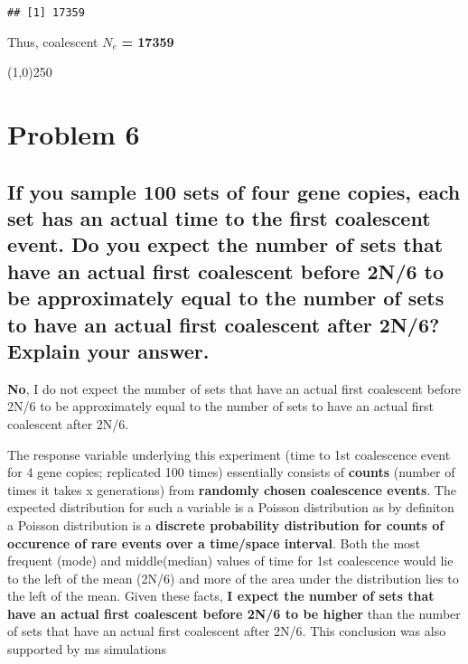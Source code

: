 \documentclass[]{article}
\begin{document}
\begin{verbatim}
## [1] 17359
\end{verbatim}

Thus, coalescent $N_e$ \textbf{= 17359}

\begin{center}
\line(1,0){250}
\end{center}

\pagebreak

\section{Problem 6}\label{problem-6}

\subsection{If you sample 100 sets of four gene copies, each set has an
actual time to the first coalescent event. Do you expect the number of
sets that have an actual first coalescent before 2N/6 to be
approximately equal to the number of sets to have an actual first
coalescent after 2N/6? Explain your
answer.}\label{if-you-sample-100-sets-of-four-gene-copies-each-set-has-an-actual-time-to-the-first-coalescent-event.-do-you-expect-the-number-of-sets-that-have-an-actual-first-coalescent-before-2n6-to-be-approximately-equal-to-the-number-of-sets-to-have-an-actual-first-coalescent-after-2n6-explain-your-answer.}

\textbf{No}, I do not expect the number of sets that have an actual
first coalescent before 2N/6 to be approximately equal to the number of
sets to have an actual first coalescent after 2N/6.

The response variable underlying this experiment (time to 1st
coalescence event for 4 gene copies; replicated 100 times) essentially
consists of \textbf{counts} (number of times it takes x generations)
from \textbf{randomly chosen coalescence events}. The expected
distribution for such a variable is a Poisson distribution as by
definiton a Poisson distribution is a
\textbf{discrete probability distribution for counts of occurence of rare events over a time/space interval}.
Both the most frequent (mode) and middle(median) values of time for 1st
coalescence would lie to the left of the mean (2N/6) and more of the
area under the distribution lies to the left of the mean. Given these
facts,
\textbf{I expect the number of sets that have an actual first coalescent before 2N/6 to be higher}
than the number of sets that have an actual first coalescent after 2N/6.
This conclusion was also supported by ms simulations \cite{ms}
\end{document}
